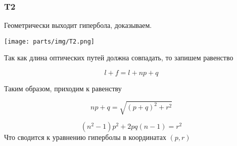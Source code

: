 \subsubsection*{T2}

Геометрически выходит гипербола, доказываем.

\texttt{[image: parts/img/T2.png]}

Так как длина оптических путей должна совпадать, то запишем равенство

\begin{equation*}
	l + f = l + np + q 
\end{equation*}

Таким образом, приходим к равенству

\begin{equation*}
	np + q = \sqrt{(p+q)^2 + r^2}
\end{equation*}

\begin{equation*}
	(n^2 - 1)p^2 + 2 p q (n -1)  = r^2
\end{equation*}
Что сводится к уравнению гиперболы в координатах $(p,r)$